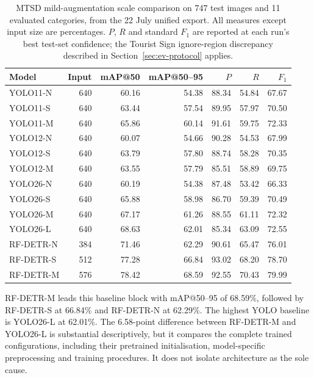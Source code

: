 \begin{table}[htbp]
\centering
\small
\caption{\gls{MTSD} mild-augmentation scale comparison on 747 test images and 11 evaluated categories, from the 22 July unified export. All measures except input size are percentages. $P$, $R$ and standard $F_1$ are reported at each run's best test-set confidence; the Tourist Sign ignore-region discrepancy described in Section~\ref{sec:ev-protocol} applies.}
\label{tab:ev-mtsd-benchmark}
\renewcommand{\arraystretch}{1.15}
\begin{tabularx}{\textwidth}{@{}>{\raggedright\arraybackslash}Xrrrrrr@{}}
\toprule
Model & Input & \gls{mAP}@50 & \gls{mAP}@50--95 & $P$ & $R$ & $F_1$ \\
\midrule
YOLO11-N & 640 & 60.16 & 54.38 & 88.34 & 54.84 & 67.67 \\
YOLO11-S & 640 & 63.44 & 57.54 & 89.95 & 57.97 & 70.50 \\
YOLO11-M & 640 & 65.86 & 60.14 & 91.61 & 59.75 & 72.33 \\
YOLO12-N & 640 & 60.07 & 54.66 & 90.28 & 54.53 & 67.99 \\
YOLO12-S & 640 & 63.79 & 57.80 & 88.74 & 58.28 & 70.35 \\
YOLO12-M & 640 & 63.55 & 57.79 & 85.51 & 58.89 & 69.75 \\
YOLO26-N & 640 & 60.19 & 54.38 & 87.48 & 53.42 & 66.33 \\
YOLO26-S & 640 & 65.88 & 58.98 & 86.70 & 59.39 & 70.49 \\
YOLO26-M & 640 & 67.17 & 61.26 & 88.55 & 61.11 & 72.32 \\
YOLO26-L & 640 & 68.63 & 62.01 & 85.34 & 63.09 & 72.55 \\
RF-DETR-N & 384 & 71.46 & 62.29 & 90.61 & 65.47 & 76.01 \\
RF-DETR-S & 512 & 77.28 & 66.84 & 93.02 & 68.20 & 78.70 \\
RF-DETR-M & 576 & 78.42 & 68.59 & 92.55 & 70.43 & 79.99 \\
\bottomrule
\end{tabularx}
\end{table}


RF-DETR-M leads this baseline block with \gls{mAP}@50--95 of 68.59\%, followed by RF-DETR-S at 66.84\% and RF-DETR-N at 62.29\%. The highest YOLO baseline is YOLO26-L at 62.01\%. The 6.58-point difference between RF-DETR-M and YOLO26-L is substantial descriptively, but it compares the complete trained configurations, including their pretrained initialisation, model-specific preprocessing and training procedures. It does not isolate architecture as the sole cause.

